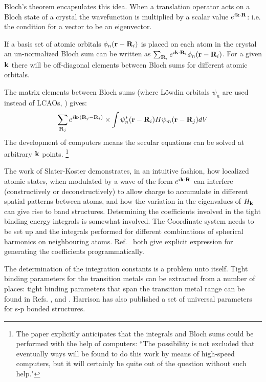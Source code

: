 Bloch's theorem encapsulates this idea. When a translation operator acts 
on a Bloch state of a crystal the wavefunction is multiplied by a scalar
value $e^{i{\bf k}\cdot{\bf R}}$: i.e. the condition for a vector to be an
eigenvector.

If a basis set of atomic orbitals $\phi_{n}({\bf r}-{\bf R}_{i})$
is placed on each atom in the crystal an un-normalized Bloch sum can be 
written as $\sum_{{\bf R}_{i}} e^{i{\bf k}\cdot{\bf R}_{i}}\phi_{n}({\bf r}-{\bf R}_{i})$. For
a given ${\bf k}$ there will be off-diagonal elements between Bloch sums
for different atomic orbitals.


The matrix elements between Bloch sums (where L\"owdin orbitals $\psi_{n}$ 
are used instead of LCAOs, \cite{lowdin62}) gives:
%
\begin{equation}
\sum_{{\bf R}_{j}} e^{i{\bf k}\cdot({\bf R}_{j}-{\bf R}_{i})}\times\int \psi^{*}_{n}({\bf r}-{\bf R}_{i})H\psi_{m}({\bf r}-{\bf R}_{j})dV
\end{equation}
%
The development of computers means the secular equations can be solved 
at arbitrary ${\bf k}$ points. \footnote{The paper explicitly anticipates that the integrals and Bloch 
sums could be performed with the help of computers: ``The possibility is not excluded 
that eventually ways will be found to do this work by means of high-speed computers, but
it will certainly be quite out of the question without such help."} 

The work of Slater-Koster demonstrates, in an intuitive fashion, how localized atomic
states, when modulated by a wave of the form $e^{i{\bf k}\cdot{\bf R}}$ can interfere 
(constructively or deconstructively) to allow charge to accumulate in different 
spatial patterns between atoms, and how the variation in the eigenvalues of $H_{{\bf k}}$
can give rise to band structures. Determining the coefficients involved in the 
tight binding energy integrals is somewhat involved. The Coordinate system needs
to be set up and the integrals performed for different combinations of spherical
harmonics on neighbouring atoms. Ref.~\cite{sharma79,podolsky04} both give explicit
expression for generating the coefficients programmatically.

The determination of the integration constants is a problem unto itself.
Tight binding parameters for the transition metals can be extracted from 
a number of places: tight binding parameters that span the transition
metal range can be found in Refs. \cite{nieminen76}, \cite{pettifor77} and \cite{jepsen75, andersen77, harrison80}.
Harrison has also published a set of universal parameters for s-p bonded structures.


